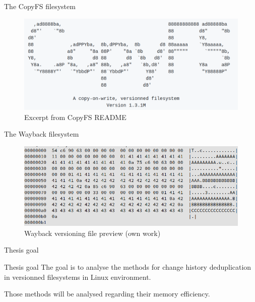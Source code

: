 \documentclass[xcolor=table]{beamer}
\begin{document}
	\begin{frame}{The CopyFS filesystem}
		\begin{figure}
			\centering

			\includegraphics[width=\textwidth]{media/copyfs.png}
			\caption{Excerpt from CopyFS README }
		\end{figure}
		
	\end{frame}

	\begin{frame}{The Wayback filesystem}
		\begin{figure}
			\centering

			\includegraphics[width=\textwidth]{media/waybackfs-history.png}
			\caption{Wayback versioning file preview (own work)}
		\end{figure}
	\end{frame}

	\begin{frame}{Thesis goal}
		\begin{block}{Thesis goal}
			The goal is to analyse the methods for change history deduplication in 
			versionned filesystems in Linux environment. 

			Those methods will be analysed regarding their memory efficiency.
		\end{block}
	\end{frame}
\end{document}
